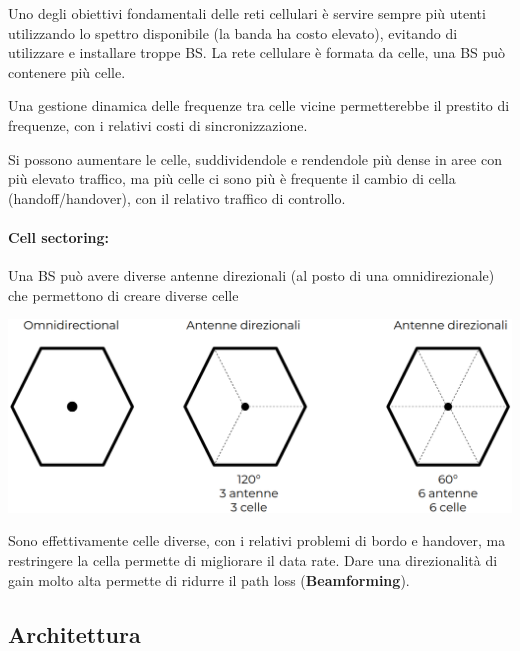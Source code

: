 Uno degli obiettivi fondamentali delle reti cellulari è servire sempre più utenti utilizzando lo spettro disponibile (la banda ha costo elevato), evitando di utilizzare e installare troppe BS. La rete cellulare è formata da celle, una BS può contenere più celle. 

Una gestione dinamica delle frequenze tra celle vicine permetterebbe il prestito di frequenze, con i relativi costi di sincronizzazione.

Si possono aumentare le celle, suddividendole e rendendole più dense in aree con più elevato traffico, ma più celle ci sono più è frequente il cambio di cella (handoff/handover), con il relativo traffico di controllo.

\paragraph{Cell sectoring:} Una BS può avere diverse antenne direzionali (al posto di una omnidirezionale) che permettono di creare diverse celle
\begin{center}
	\includegraphics[width=0.8\linewidth]{img/mobile/sectoring}
\end{center}

Sono effettivamente celle diverse, con i relativi problemi di bordo e handover, ma restringere la cella permette di migliorare il data rate. Dare una direzionalità di gain molto alta permette di ridurre il path loss (\textbf{Beamforming}).

\subsection{Architettura}

